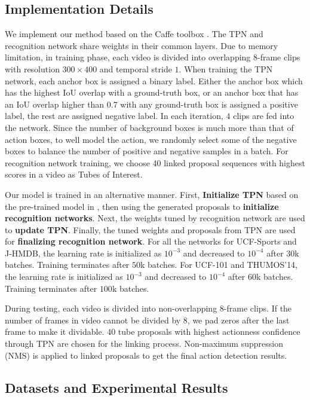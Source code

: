 \documentclass[10pt,twocolumn,letterpaper]{article}
\begin{document}
\subsection{Implementation Details}
\label{subsec:basic_settings}
We implement our method based on the Caffe toolbox \cite{jia2014caffe}. The TPN and recognition network share weights in their common layers. Due to memory limitation, in training phase, each video is divided into overlapping $8$-frame clips with resolution $300\times400$ and temporal stride $1$. When training the TPN network, each anchor box is assigned a binary label. Either the anchor box which has the highest IoU overlap with a ground-truth box, or an anchor box that has an IoU overlap higher than 0.7 with any ground-truth box is assigned a positive label, the rest are assigned negative label. In each iteration, $4$ clips are fed into the network. Since the number of background boxes is much more than that of action boxes, to well model the action, we randomly select some of the negative boxes to balance the number of positive and negative samples in a batch. For recognition network training, we choose 40 linked proposal sequences with highest scores in a video as Tubes of Interest.

 Our model is trained in an alternative manner. First, \textbf {Initialize TPN} based on the pre-trained model in \cite{c3d}, then using the generated proposals to \textbf{initialize recognition networks}. Next, the weights tuned by recognition network are used to \textbf{update TPN}. Finally, the tuned weights and proposals from TPN are used for \textbf{finalizing recognition network}. For all the networks for UCF-Sports and J-HMDB, the learning rate is initialized as $10^{-3}$ and decreased to $10^{-4}$ after $30$k batches. Training terminates after $50$k batches. For UCF-101 and THUMOS'14, the learning rate is initialized as $10^{-3}$ and decreased to $10^{-4}$ after $60$k batches. Training terminates after $100$k batches.

During testing, each video is divided into non-overlapping $8$-frame clips. If the number of frames in video cannot be divided by $8$, we pad zeros after the last frame to make it dividable. $40$ tube proposals with highest actionness confidence through TPN are chosen for the linking process. Non-maximum suppression (NMS) is applied to linked proposals to get the final action detection results.

\subsection{Datasets and Experimental Results}
\label{subsec:results}
\end{document}
